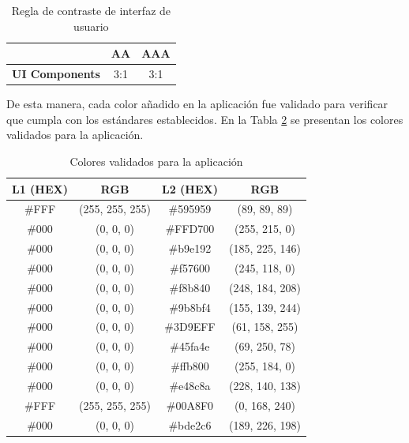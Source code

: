 \documentclass[lettersize,journal]{IEEEtran}
\begin{document}
\begin{itemize}
		\begin{table}[H]
			\centering
			\caption{Regla de contraste de interfaz de usuario}
			\label{tab:regla-contraste-ui}
			\begin{tabular}{|c|c|c|}
				\hline
				& \textbf{AA} & \textbf{AAA} \\
				\hline
				\textbf{UI Components} & 3:1 & 3:1 \\
				\hline
			\end{tabular}
		\end{table}
	
		\noindent De esta manera, cada color añadido en la aplicación fue validado para verificar que cumpla con los estándares establecidos. En la Tabla \ref{tab:colores-validados} se presentan los colores validados para la aplicación.
	
		\begin{table}[ht]
			\centering
			\caption{Colores validados para la aplicación}
			\label{tab:colores-validados}
			\footnotesize
			\begin{tabular}{|c|c|c|c|}
				\hline
				\textbf{L1 (HEX)} & \textbf{RGB} & \textbf{L2 (HEX)} & \textbf{RGB} \\
				\hline
				\#FFF & (255, 255, 255) & \#595959 & (89, 89, 89) \\
				\hline
				\#000 & (0, 0, 0) & \#FFD700 & (255, 215, 0) \\
				\hline
				\#000 & (0, 0, 0) & \#b9e192 & (185, 225, 146) \\
				\hline
				\#000 & (0, 0, 0) & \#f57600 & (245, 118, 0) \\
				\hline
				\#000 & (0, 0, 0) & \#f8b840 & (248, 184, 208) \\
				\hline
				\#000 & (0, 0, 0) & \#9b8bf4 & (155, 139, 244) \\
				\hline
				\#000 & (0, 0, 0) & \#3D9EFF & (61, 158, 255) \\
				\hline
				\#000 & (0, 0, 0) & \#45fa4e & (69, 250, 78) \\
				\hline
				\#000 & (0, 0, 0) & \#ffb800 & (255, 184, 0) \\
				\hline
				\#000 & (0, 0, 0) & \#e48c8a & (228, 140, 138) \\
				\hline
				\#FFF & (255, 255, 255) & \#00A8F0 & (0, 168, 240) \\
				\hline
				\#000 & (0, 0, 0) & \#bde2c6 & (189, 226, 198) \\
				\hline
			\end{tabular}
		\end{table}
		

\end{itemize}
\end{document}
